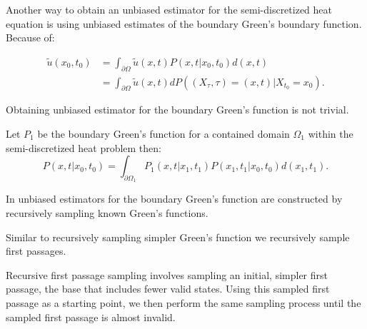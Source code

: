 \documentclass[a4paper,12pt]{article}
\begin{document}
Another way to obtain an unbiased estimator for the semi-discretized heat equation is using unbiased estimates
of the boundary Green's boundary function. Because of:

\begin{align}
  \tilde{u}(x_{0},t_{0}) & = \int_{\partial \Omega} \tilde{u}(x,t) P(x,t|x_{0},t_{0}) d(x,t)                    \\
                         & = \int_{\partial \Omega} \tilde{u}(x,t)  dP((X_{\tau},\tau) = (x,t)| X_{t_0} = x_0 )
  .
\end{align}


Obtaining unbiased estimator for the boundary Green's function is not trivial.

\begin{lemma}
  Let $P_{1}$ be the boundary Green's function for a contained domain $\Omega_{1}$ within the semi-discretized heat problem
  then:
  \begin{equation}
    P(x,t|x_{0},t_{0})= \int_{\partial \Omega_{1}} P_{1}(x,t|x_{1},t_{1}) P(x_{1},t_{1}|x_{0},t_{0}) d(x_{1},t_{1})
    .
  \end{equation}
\end{lemma}


\begin{related}
  In \cite{qi_bidirectional_2022} unbiased estimators for the boundary Green's function are constructed
  by recursively sampling known Green's functions.
\end{related}

Similar to recursively  sampling simpler Green's function we recursively sample first passages.

\begin{technique}
  Recursive first passage sampling involves sampling an initial,
  simpler first passage, the base that includes fewer valid states. Using
  this sampled first passage as a starting point, we
  then perform the same sampling process until the sampled
  first passage is almost invalid.
\end{technique}
\end{document}

